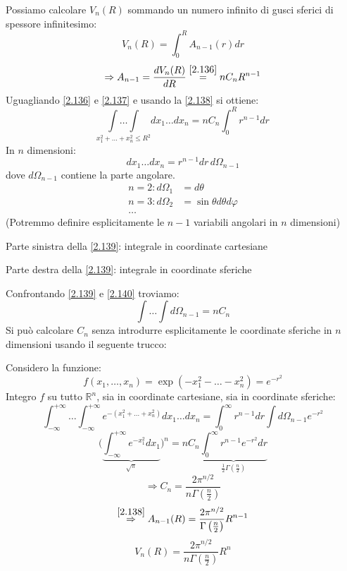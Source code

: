 \documentclass[a4paper,11pt]{report}
\newcommand{\Rn}{\mathbb{R}^n}
\begin{document}
Possiamo calcolare $V_n(R)$ sommando un numero infinito di gusci sferici di spessore infinitesimo:
\begin{equation}
V_n(R)=\int_0^R A_{n-1}(r)dr
\label{2.137}
\end{equation}
\begin{equation}
\Rightarrow A_{n-1}=\frac{dV_n(R)}{dR}\overset{\eqref{2.136}}{=} nC_n R^{n-1}
\label{2.138}
\end{equation}
Uguagliando \eqref{2.136} e \eqref{2.137} e usando la \eqref{2.138} si ottiene:
\begin{equation}
\underset{x_1^2 + \ldots + x_n^2 \leq R^2}{\int \ldots \int} dx_1\ldots dx_n = n C_n \int_0^R r^{n-1}dr
\label{2.139}
\end{equation}
In $n$ dimensioni: 
\begin{equation}
dx_1 \ldots dx_n=r^{n-1}dr\,d\Omega_{n-1}
\label{2.140}
\end{equation}
dove $d\Omega_{n-1} $ contiene la parte angolare.
\[
\begin{aligned}
n=2: d\Omega_1&=d\theta \\ 
n=3: d\Omega_2&=\sin\theta d\theta d\varphi \\
\dots 
\end{aligned}
\]
(Potremmo definire esplicitamente le $n-1$ variabili angolari in $n$ dimensioni)

Parte sinistra della \eqref{2.139}: integrale in coordinate cartesiane

Parte destra della \eqref{2.139}: integrale in coordinate sferiche

Confrontando \eqref{2.139} e \eqref{2.140} troviamo:
\begin{equation}
\int \ldots \int d\Omega_{n-1}=nC_n
\label{2.141}
\end{equation}
Si pu\`o calcolare $C_n$ senza introdurre esplicitamente le coordinate sferiche in $n$ dimensioni usando il seguente trucco: 

Considero la funzione:
\[
f(x_1,\ldots,x_n)=\exp(-x_1^2 - \ldots - x_n^2)=e^{-r^2}
\]
Integro $f$ su tutto $\Rn$, sia in coordinate cartesiane, sia in coordinate sferiche:
\[
\int_{-\infty}^{+\infty} \ldots \int_{-\infty}^{+\infty} e^{-(x_1^2 + \ldots + x_n^2)}dx_1 \ldots dx_n = \int_0^{\infty}r^{n-1}dr\int d\Omega_{n-1}e^{-r^2}
\]
\[
\Big( \underbrace{\int_{-\infty}^{+\infty}e^{-x_1^2}dx_1}_{\sqrt{\pi}} \Big)^n = n C_n \underbrace{\int_0^\infty r^{n-1}e^{-r^2}dr}_{\frac{1}{2}\Gamma(\frac{n}{2}) }
\]
\[
\Rightarrow C_n = \frac{2\pi^{n/2}}{n\Gamma\left(\frac{n}{2}\right)}
\]
\begin{equation}
\overset{\eqref{2.138}}{\Rightarrow}A_{n-1}(R) = \frac{2\pi^{n/2}}{\Gamma\left(\frac{n}{2}\right)}R^{n-1}
\label{2.142}
\end{equation}
\begin{equation}
V_n(R)=\frac{2\pi^{n/2}}{n\Gamma\left(\frac{n}{2}\right)}R^n 
\label{2.143}
\end{equation}
\end{document}
